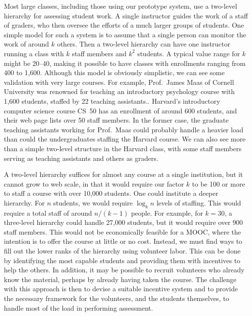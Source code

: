 \documentclass[12pt]{article}
\begin{document}
Most large classes, including those using our prototype system, use a
two-level hierarchy for assessing student work.  A single instructor
guides the work of a staff of graders, who then oversee the efforts of
a much larger groups of students.  One simple model for such a system
is to assume that a single person can monitor the work of around $k$
others.  Then a two-level hierarchy can have one instructor running a
class with $k$ staff members and $k^2$ students.  A typical value
range for $k$ might be 20--40, making it possible to have classes with
enrollments ranging from 400 to 1,600.  Although this model is
obviously simplistic, we can see some validation with very large
courses.  For example, Prof.~James Maas of Cornell University was
renowned for teaching an introductory psychology course with 1,600
students, staffed by 22 teaching assistants.\cite{arenson-nyt00}.
Harvard's introductory computer science course CS~50 has an enrollment
of around 600 students, and their web page lists over 50 staff
members.  In the former case, the graduate teaching assistants working
for Prof.~Maas could probably handle a heavier load than could the
undergraduates staffing the Harvard course.  We can also see more than
a simple two-level structure in the Harvard class, with some staff members
serving as teaching assistants and others as graders.

A two-level hierarchy suffices for almost any course at a single
institution, but it cannot grow to web scale, in that it would require
our factor $k$ to be 100 or more to staff a course with over 10,000
students.  One could institute a deeper hierarchy.  For $n$ students,
we would require $\log_k n$ levels of staffing.  This would require a
total staff of around $n/(k-1)$ people.  For example, for $k = 30$, a
three-level hierarchy could handle 27,000 students, but it would
require over 900 staff members.  This would not be economically feasible
for a MOOC, where the intention is to offer the course at little or no
cost.  Instead, we must find ways to fill out the lower ranks of the
hierarchy using volunteer labor.  This can be done by identifying the
most capable students and providing them with incentives to help the
others.  In addition, it may be possible to recruit volunteers who
already know the material, perhaps by already having taken the course.
The challenge with this approach is then to devise a suitable
incentive system and to provide the necessary framework for the
volunteers, and the students themselves, to handle most of the load in
performing assessment.
\end{document}
